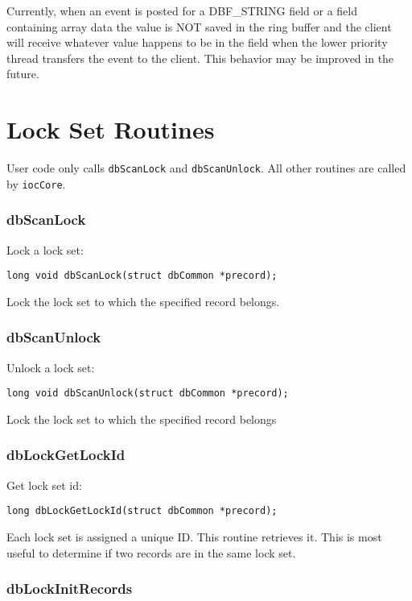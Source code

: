 Currently, when an event is posted for a DBF\_STRING field or a field containing array data the value is NOT saved in the 
ring buffer and the client will receive whatever value happens to be in the field when the lower priority thread transfers 
the event to the client. This behavior may be improved in the future.

\section{Lock Set Routines}

User code only calls \verb|dbScanLock| and \verb|dbScanUnlock|. All other routines are called by \verb|iocCore|.

\subsubsection{dbScanLock}

Lock a lock set:

\begin{verbatim}long void dbScanLock(struct dbCommon *precord);
\end{verbatim}Lock the lock set to which the specified record belongs.

\subsubsection{dbScanUnlock}

Unlock a lock set:

\begin{verbatim}long void dbScanUnlock(struct dbCommon *precord);
\end{verbatim}Lock the lock set to which the specified record belongs

\subsubsection{dbLockGetLockId}

Get lock set id:

\begin{verbatim}long dbLockGetLockId(struct dbCommon *precord);
\end{verbatim}Each lock set is assigned a unique ID. This routine retrieves it. This is most useful to determine if two records are in the 
same lock set.

\subsubsection{dbLockInitRecords}

